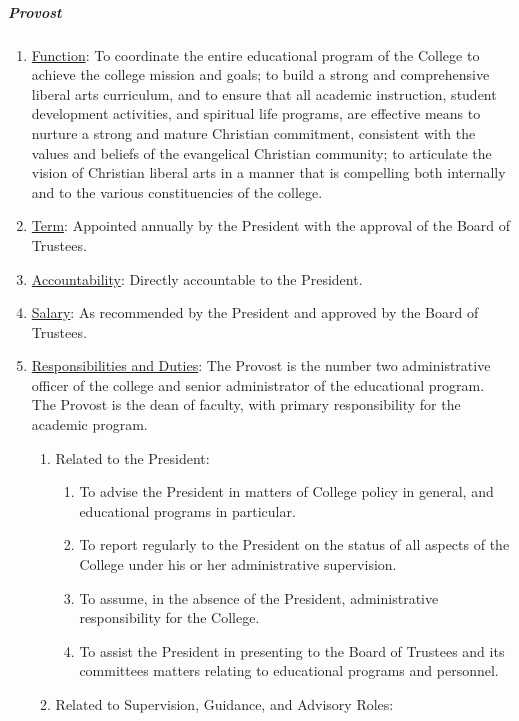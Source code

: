\documentclass[letterpaper, 11pt]{article}
\begin{document}
				\subparagraph{Provost}
					\begin{enumerate}[label=\alph*)]
						\item{\underline{Function}:  To coordinate the entire educational program of the College to achieve the college mission and goals; to build a strong and comprehensive liberal arts curriculum, and to ensure that all academic instruction, student development activities, and spiritual life programs, are effective means to nurture a strong and mature Christian commitment, consistent with the values and beliefs of the evangelical Christian community; to articulate the vision of Christian liberal arts in a manner that is compelling both internally and to the various constituencies of the college.}

						\item{\underline{Term}:  Appointed annually by the President with the approval of the Board of Trustees.}
						\item{\underline{Accountability}:  Directly accountable to the President.}
						\item{\underline{Salary}:  As recommended by the President and approved by the Board of Trustees.}
						\item{\underline{Responsibilities and Duties}:  The Provost is the number two administrative officer of the college and senior administrator of the educational program.  The Provost is the dean of faculty, with primary responsibility for the academic program.
							\begin{enumerate}[label=\arabic*)]
								\item{Related to the President:
									\begin{enumerate}[label=(\alph*)]
										\item{To advise the President in matters of College policy in general, and educational programs in particular.}
										\item{To report regularly to the President on the status of all aspects of the College under his or her administrative supervision.}
										\item{To assume, in the absence of the President, administrative responsibility for the College.}
										\item{To assist the President in presenting to the Board of Trustees and its committees matters relating to educational programs and personnel.}
									\end{enumerate}
								}
								\item{Related to Supervision, Guidance, and Advisory Roles:
}
\end{enumerate}}
\end{enumerate}
\end{document}
